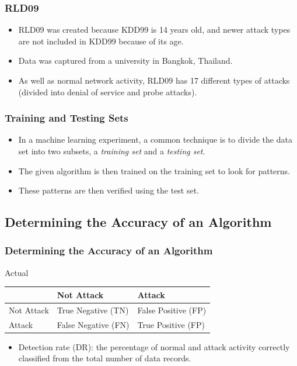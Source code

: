 \documentclass{beamer}
\newcommand{\linespace}{\vskip 0.25cm}
\begin{document}
\begin{frame}
  \frametitle{RLD09}
	\begin{itemize}
		\item RLD09 was created because KDD99 is 14 years old, and newer attack types are not included in KDD99 because of its age.
		\item Data was captured from a university in Bangkok, Thailand.
		\item As well as normal network activity, RLD09 has 17 different types of attacks (divided into denial of service and probe attacks).
	\end{itemize}
\end{frame}



\begin{frame}
  \frametitle{Training and Testing Sets}
	\begin{itemize}
		\item In a machine learning experiment, a common technique is to divide the data set into two subsets, a \emph{training set} and a \emph{testing set}.
        \item The given algorithm is then trained on the training set to look for patterns.
        \item These patterns are then verified using the test set.
	\end{itemize}
\end{frame}



\subsection{Determining the Accuracy of an Algorithm}
\begin{frame}
  \frametitle{Determining the Accuracy of an Algorithm}
\begin{table}
Actual
\begin{tabular}{l|ll}
 & Not Attack & Attack \\ \hline
Not Attack & True Negative (TN) & False Positive (FP) \\
Attack & False Negative (FN) & True Positive (FP)  \\
\end{tabular}
\end{table}
\linespace
	\begin{itemize}
		\item Detection rate (DR): the percentage of normal and attack activity correctly classified from the total number of data records.
	\end{itemize}
\end{frame}
\end{document}
